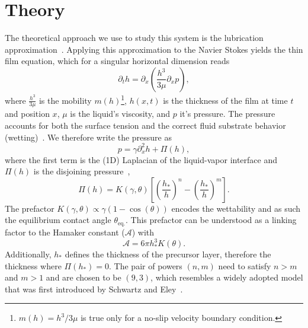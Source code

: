 \documentclass[twocolumn,amsmath,amssymb,showpacs,pre,nofootinbib,superscriptaddress]{revtex4-1} %
\begin{document}
\section{Theory}\label{sec:theory}
The theoretical approach we use to study this system is the lubrication approximation~\cite{Reynolds, RevModPhys.69.931, PhysRevE.63.011208}.
Applying this approximation to the Navier Stokes yields the thin film equation, which for a singular horizontal dimension reads~\cite{RevModPhys.81.739, RevModPhys.81.1131, THIELE2014399}
\begin{equation}\label{eq:thin_film_simple}
    \partial_t h = \partial_x \left(\frac{h^3}{3\mu}\partial_x p\right),
\end{equation}
where $\frac{h^3}{3\mu}$ is the mobility $m(h)$\footnote{$m(h) = h^3/3\mu$ is true only for a no-slip velocity boundary condition.}, $h(x,t)$ is the thickness of the film at time $t$ and position $x$, $\mu$ is the liquid's viscosity, and $p$ it's pressure.
The pressure accounts for both the surface tension and the correct fluid substrate behavior (wetting)~\cite{PhysRevE.100.033313}.
We therefore write the pressure as
\begin{equation}\label{eq:pressure}
    p = \gamma \partial_x^2 h + \Pi(h),
\end{equation}
where the first term is the (1D) Laplacian of the liquid-vapor interface and $\Pi(h)$ is the disjoining pressure~\cite{RevModPhys.69.931, RevModPhys.81.739, Peschka9275, PhysRevE.63.011208},
\begin{equation}\label{eq:disjoin}
    \Pi(h) = K(\gamma,\theta)\left[\left(\frac{h_{\ast}}{h}\right)^n - \left(\frac{h_{\ast}}{h}\right)^m\right].
\end{equation}
The prefactor $K(\gamma,\theta)\propto \gamma(1-\cos(\theta))$ encodes the wettability and as such the equilibrium contact angle $\theta_{\text{eq.}}$.
This prefactor can be understood as a linking factor to the Hamaker constant ($\mathcal{A}$) with~~\cite{PhysRevE.93.013120, bestehorn20033d, van1988interfacial}
\begin{equation}
    \mathcal{A} = 6\pi h_{\ast}^3 K(\theta).    
\end{equation}
Additionally, $h_{\ast}$ defines the thickness of the precursor layer, therefore the thickness where $\Pi(h_{\ast}) = 0$.
The pair of powers $(n,m)$ need to satisfy $n > m$ and $m > 1$ and are chosen to be $(9,3)$, which resembles a  widely adopted model that was first introduced by Schwartz and Eley~\cite{SCHWARTZ1998173, RevModPhys.81.739}.
\end{document}
